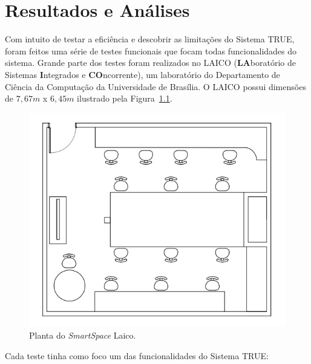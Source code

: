 \chapter{Resultados e Análises}

	Com intuito de testar a eficiência e descobrir as limitações do Sistema TRUE, foram feitos uma série de testes funcionais que focam todas funcionalidades do sistema. Grande parte dos testes foram realizados no LAICO (\textbf{LA}boratório de Sistemas \textbf{I}ntegrados e \textbf{CO}ncorrente), um laboratório do Departamento de Ciência da Computação da Universidade de Brasília. O LAICO possui dimensões de $\displaystyle 7,67m$ x $\displaystyle 6,45m$ ilustrado pela Figura~\ref{fig:laico}.

	\begin{figure}[htb]
			\begin{center}
				\includegraphics[scale=0.6]{figuras/4.ProblemaEProposta/laico.png}
			\end{center}
			\caption{Planta do \textit{SmartSpace} Laico.}
			\label{fig:laico}
		\end{figure}	

	Cada teste tinha como foco um das funcionalidades do Sistema TRUE:

